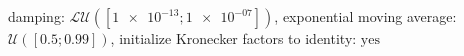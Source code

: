 damping: $\mathcal{LU}([\num[scientific-notation=true]{1e-13}; \num[scientific-notation=true]{1e-07}])$, exponential moving average: $\mathcal{U}([\num[scientific-notation=true]{0.5}; \num[scientific-notation=true]{0.99}])$, initialize Kronecker factors to identity: $\text{yes}$